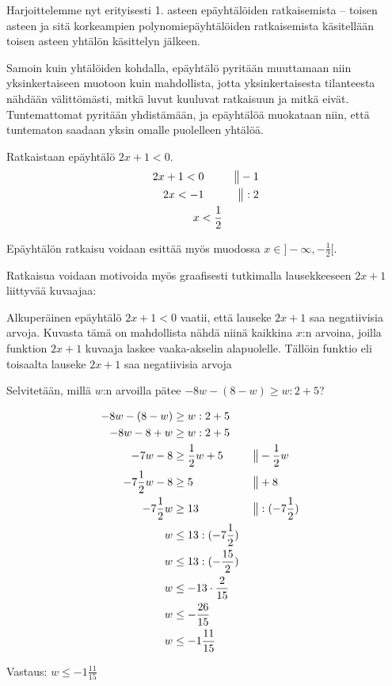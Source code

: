 
Harjoittelemme nyt erityisesti 1. asteen epäyhtälöiden ratkaisemista -- toisen asteen ja sitä korkeampien polynomiepäyhtälöiden ratkaisemista käsitellään toisen asteen yhtälön käsittelyn jälkeen.

Samoin kuin yhtälöiden kohdalla, epäyhtälö pyritään muuttamaan niin yksinkertaiseen muotoon kuin mahdollista, jotta yksinkertaisesta tilanteesta nähdään välittömästi, mitkä luvut kuuluvat ratkaisuun ja mitkä eivät. Tuntemattomat pyritään yhdistämään, ja epäyhtälöä muokataan niin, että tuntematon saadaan yksin omalle puolelleen yhtälöä.


\begin{esimerkki}
Ratkaistaan epäyhtälö $2x+1<0$.
\begin{align*}
2x+1<0 \ \ \ \ \ && \big\| -1 \\
2x<-1 \ \ \ \ \ && \big\| :2 \\
x<\-\frac{1}{2}
\end{align*}

Epäyhtälön ratkaisu voidaan esittää myös muodossa $x \in ]-\infty, -\frac{1}{2}[$.

Ratkaisua voidaan motivoida myös graafisesti tutkimalla lausekkeeseen $2x+1$ liittyvää kuvaajaa:

\begin{kuvaajapohja}{1}{-2}{2}{-2}{2}
\end{kuvaajapohja}

Alkuperäinen epäyhtälö $2x+1<0$ vaatii, että lauseke $2x+1$ saa negatiivisia arvoja. Kuvasta tämä on mahdollista nähdä niinä kaikkina $x$:n arvoina, joilla funktion $2x+1$ kuvaaja laskee vaaka-akselin alapuolelle. Tällöin funktio eli toisaalta lauseke $2x+1$ saa negatiivisia arvoja

\end{esimerkki}

\begin{esimerkki}Selvitetään, millä $w$:n arvoilla pätee $-8w-(8-w)\geq w:2+5$?

\begin{align*}
-8w-(8-w)&\geq w:2+5 \\
-8w-8+w&\geq w:2+5 \\
-7w-8&\geq \frac12 w+5  \ \ \ \ \ && \big\| -\frac12 w \\
-7\frac12 w-8&\geq 5  \ \ \ \ \ && \big\| +8 \\
-7\frac12 w&\geq 13  \ \ \ \ \ && \big\| :(-7\frac12) \\
w&\leq 13:(-7\frac12) \\
w&\leq 13:(-\frac{15}{2}) \\
w&\leq -13\cdot \frac{2}{15} \\
w&\leq -\frac{26}{15} \\
w&\leq -1\frac{11}{15}
\end{align*}

Vastaus: $w\leq -1\frac{11}{15}$
\end{esimerkki}

